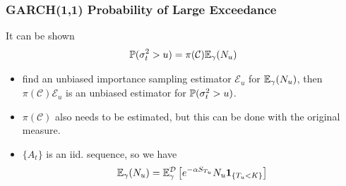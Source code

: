 \documentclass{beamer}
\begin{document}
\begin{frame}
  \frametitle{GARCH(1,1) Probability of Large Exceedance}
  It can be shown
  \[
  \P(\sigma_t^2 > u) = \pi(\mathcal C) \E_\gamma (N_u)
  \]
  \begin{itemize}
  \item find an unbiased importance sampling estimator $\mathcal E_u$ for
     $\E_\gamma (N_u)$, then $\pi(\mathcal C) \mathcal E_u$ is an unbiased estimator
     for $\P(\sigma_t^2 > u)$.
   \item $\pi(\mathcal C)$ also needs to be estimated, but this can be done with the original measure.
   \item $\{A_t\}$ is an iid. sequence, so we have
     \[
     \E_\gamma(N_u) = \E_\gamma^{\mathcal D} \left[
       e^{-\alpha S_{T_u}} N_u \1{T_u < K}
     \right]
     \]
  \end{itemize}
\end{frame}

\end{document}
